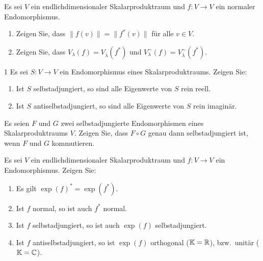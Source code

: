 \begin{question}[subtitle = Haupt- und Eigenräume normaler Endomorphismen]{1}
  Es sei $V$ ein endlichdimensionaler Skalarproduktraum und $f \colon V \to V$ ein normaler Endomorphismus.
  \begin{enumerate}[leftmargin=*]
    \item
      Zeigen Sie, dass $\|f(v)\| = \|f^*(v)\|$ für alle $v \in V$.
    \item
      Zeigen Sie, dass $V_\lambda(f) = V_{\overline{\lambda}}(f^*)$ und $V^\sim_\lambda(f) = V^\sim_{\overline{\lambda}}(f^*)$.
  \end{enumerate}
\end{question}


\begin{question}[subtitle = Eigenwerte (anti)selbstadjungierter Endomorphismen]{1}
  Es sei $S \colon V \to V$ ein Endomorphismus eines Skalarproduktraums.
  Zeigen Sie:
  \begin{enumerate}[leftmargin=*]
    \item
      Ist $S$ selbstadjungiert, so sind alle Eigenwerte von $S$ rein reell.
    \item
      Ist $S$ antiselbstadjungiert, so sind alle Eigenwerte von $S$ rein imaginär.
  \end{enumerate}
\end{question}


\begin{question}[subtitle = Komposition selbstadjungierter Endomorphismen]{1}
  Es seien $F$ und $G$ zwei selbstadjungierte Endomorphismen eines Skalarproduktraums $V$.
  Zeigen Sie, dass $F \circ G$ genau dann selbstadjungiert ist, wenn $F$ und $G$ kommutieren.
\end{question}


\begin{question}[subtitle = Rechenregeln für das Matrixexponential]{1}
  Es sei $V$ ein endlichdimensionaler Skalarproduktraum und $f \colon V \to V$ ein Endomorphismus.
  Zeigen Sie:
  \begin{enumerate}[leftmargin=*]
    \item
      Es gilt $\exp(f)^* = \exp(f^*)$.
    \item
      Ist $f$ normal, so ist auch $f^*$ normal.
    \item
      Ist $f$ selbstadjungiert, so ist auch $\exp(f)$ selbstadjungiert.
    \item
      Ist $f$ antiselbstadjungiert, so ist $\exp(f)$ orthogonal ($\mathbb{K} = \mathbb{R}$), bzw.\ unitär ($\mathbb{K} = \mathbb{C}$).
  \end{enumerate}
\end{question}






